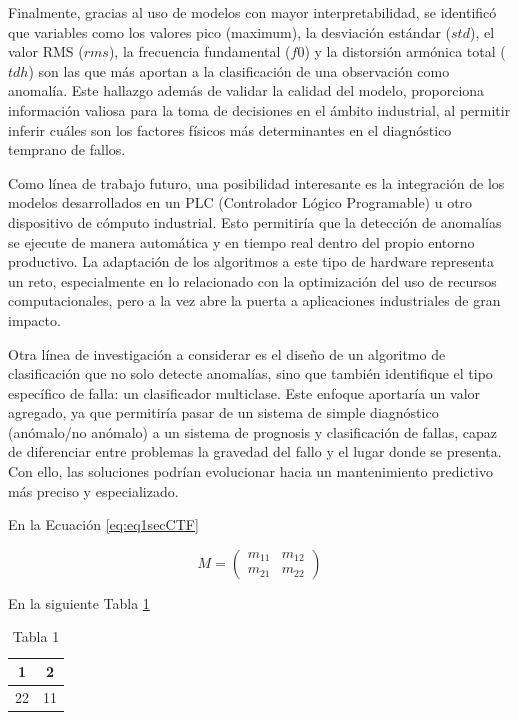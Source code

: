\documentclass[11pt,a4paper,spanish]{book}
\numberwithin{equation}{chapter}
\numberwithin{figure}{chapter}
\begin{document}
Finalmente, gracias al uso de modelos con mayor interpretabilidad, se identificó que 
variables como los valores pico (maximum), la desviación estándar ($std$), el valor RMS ($rms$),
la frecuencia fundamental ($f0$) y la distorsión armónica total ($tdh$) son las que más 
aportan a la clasificación de una observación como anomalía. Este hallazgo  además de 
validar la calidad del modelo, proporciona información valiosa para la toma de 
decisiones en el ámbito industrial, al permitir inferir cuáles son los factores físicos
más determinantes en el diagnóstico temprano de fallos.


Como línea de trabajo futuro, una posibilidad interesante es la integración de los 
modelos desarrollados en un PLC (Controlador Lógico Programable) u otro dispositivo
de cómputo industrial. Esto permitiría que la detección de anomalías se ejecute de 
manera automática y en tiempo real dentro del propio entorno productivo. La adaptación
de los algoritmos a este tipo de hardware representa un reto, especialmente en lo 
relacionado con la optimización del uso de recursos computacionales, pero a la vez abre
la puerta a aplicaciones industriales de gran impacto.


Otra línea de investigación a considerar es el diseño de un algoritmo de clasificación
que no solo detecte anomalías, sino que también identifique el tipo específico de falla:
un clasificador multiclase.  Este enfoque aportaría un valor agregado, ya que permitiría
pasar de un sistema de simple diagnóstico (anómalo/no anómalo) a un sistema de prognosis
y clasificación de fallas, capaz de diferenciar entre problemas la gravedad del fallo y 
el lugar donde se presenta. Con ello, las soluciones podrían evolucionar hacia un 
mantenimiento predictivo más preciso y especializado.


En la Ecuación \eqref{eq:eq1secCTF}


\begin{equation}\label{eq:eq1secCTF}
M=\begin{pmatrix}
	m_{11}&m_{12}\\
	m_{21}&m_{22}
\end{pmatrix}
\end{equation}

En la siguiente Tabla \ref{tab:tab1secCTF}

\begin{table}[h]
\centering
\begin{tabular}{|c|c|}
	\hline
	1 & 2 \\
	\hline
	22 & 11 \\
	\hline
\end{tabular}
\caption{Tabla 1}
\label{tab:tab1secCTF}
\end{table}
\end{document}
